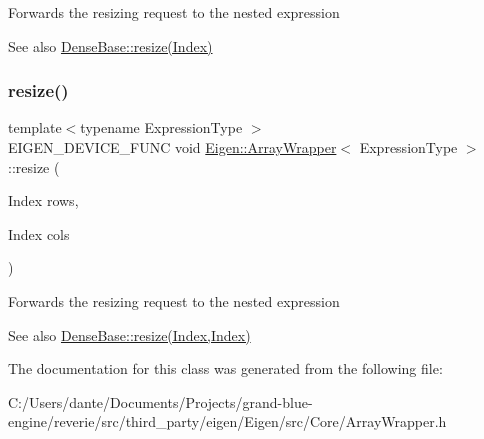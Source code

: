 Forwards the resizing request to the nested expression \begin{DoxySeeAlso}{See also}
\mbox{\hyperlink{class_eigen_1_1_dense_base_a13027a493a68a13496610caf3d81bd3e}{Dense\+Base\+::resize(\+Index)}} 
\end{DoxySeeAlso}
\mbox{\label{class_eigen_1_1_array_wrapper_aaead58c7011ff95bb588d9bb242aca8a}} 
\subsubsection{\texorpdfstring{resize()}{resize()}\hspace{0.1cm}{\footnotesize\ttfamily [2/2]}}
{\footnotesize\ttfamily template$<$typename Expression\+Type $>$ \\
E\+I\+G\+E\+N\+\_\+\+D\+E\+V\+I\+C\+E\+\_\+\+F\+U\+NC void \mbox{\hyperlink{class_eigen_1_1_array_wrapper}{Eigen\+::\+Array\+Wrapper}}$<$ Expression\+Type $>$\+::resize (\begin{DoxyParamCaption}\item[{Index}]{rows,  }\item[{Index}]{cols }\end{DoxyParamCaption})\hspace{0.3cm}{\ttfamily [inline]}}

Forwards the resizing request to the nested expression \begin{DoxySeeAlso}{See also}
\mbox{\hyperlink{class_eigen_1_1_dense_base_aef40c2ee48a85a799270c8258cc12b76}{Dense\+Base\+::resize(\+Index,\+Index)}} 
\end{DoxySeeAlso}


The documentation for this class was generated from the following file\+:\begin{DoxyCompactItemize}
\item 
C\+:/\+Users/dante/\+Documents/\+Projects/grand-\/blue-\/engine/reverie/src/third\+\_\+party/eigen/\+Eigen/src/\+Core/Array\+Wrapper.\+h\end{DoxyCompactItemize}
